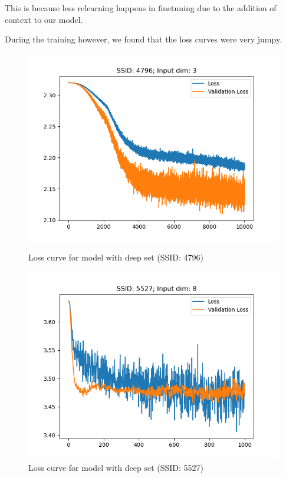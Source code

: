 \documentclass[12pt, twoside, ngerman]{report}
\begin{document}
\iffalse

This is because less relearning happens in finetuning due to the addition of context to our model.

During the training however,  we found that the loss curves were very jumpy.

\begin{figure}[h]%
\centering
\begin{minipage}{0.45\textwidth}
\includegraphics[width=\textwidth]{images/DeepSetLoss4796}
\caption{Loss curve for model with deep set (SSID: 4796)}
    \label{fig:DeepSetLoss4796}
\end{minipage}\hfill
\begin{minipage}{0.45\textwidth}
\includegraphics[width=\textwidth]{images/DeepSetLoss5527}
\caption{Loss curve for model with deep set (SSID: 5527)}
    \label{fig:DeepSetLoss5527}
\end{minipage}
\end{figure}
\end{document}
